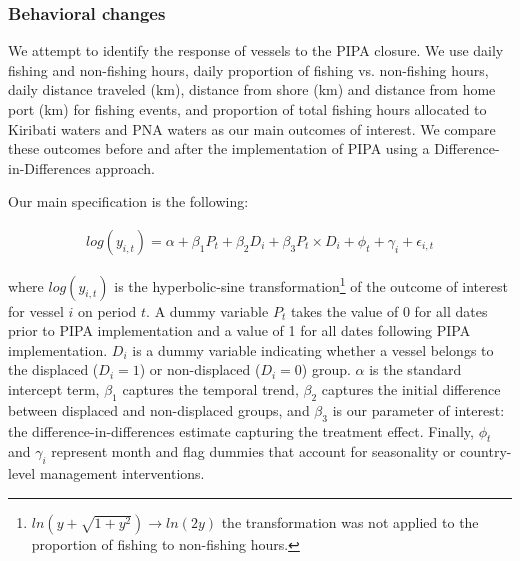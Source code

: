 \documentclass[9p,twocolumn,twoside,lineno]{pnas-new}
\begin{document}
\begin{scriptsize}
\subsubsection{Behavioral changes}

We attempt to identify the response of vessels to the PIPA closure. We use daily fishing and non-fishing hours, daily proportion of fishing vs. non-fishing hours, daily distance traveled (km), distance from shore (km) and distance from home port (km) for fishing events, and proportion of total fishing hours allocated to Kiribati waters and PNA waters as our main outcomes of interest. We compare these outcomes before and after the implementation of PIPA using a Difference-in-Differences approach. 

Our main specification is the following:

\begin{figure}[H]
\begin{align}
log(y_{i,t}) = \alpha + \beta_1 P_t + \beta_2 D_i + \beta_3 P_t \times D_i + \phi_t + \gamma_i + \epsilon_{i,t}
\label{eqn:did}
\end{align}
\end{figure}

\noindent where $log(y_{i,t})$ is the hyperbolic-sine transformation\footnote{$ln\left(y + \sqrt{1 + y^2}\right)\rightarrow ln(2y)$ the transformation was not applied to the proportion of fishing to non-fishing hours.} of the outcome of interest for vessel $i$ on period $t$. A dummy variable $P_t$ takes the value of 0 for all dates prior to PIPA implementation and a value of 1 for all dates following PIPA implementation. $D_i$ is a dummy variable indicating whether a vessel belongs to the displaced ($D_i = 1$) or non-displaced ($D_i = 0$) group. $\alpha$ is the standard intercept term, $\beta_1$ captures the temporal trend, $\beta_2$ captures the initial difference between displaced and non-displaced groups, and $\beta_3$ is our parameter of interest: the difference-in-differences estimate capturing the treatment effect. Finally, $\phi_t$ and $\gamma_i$ represent month and flag dummies that account for seasonality or country-level management interventions. 

\end{scriptsize}
\end{document}
